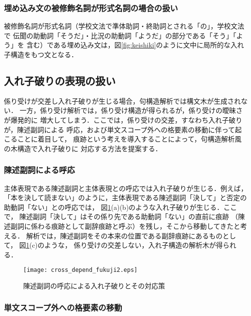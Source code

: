 \documentclass[japanese]{jnlp_1.2}
\begin{document}
    \subsubsection{埋め込み文の被修飾名詞が形式名詞の場合の扱い}

被修飾名詞が形式名詞（学校文法で準体助詞・終助詞とされる「の」，学校文法で
伝聞の助動詞「そうだ」・比況の助動詞「ようだ」の部分である「そう」「よう」を
含む）である埋め込み文は，図\ref{fig:keishiki}のように文中に局所的な入れ子構造をもつ文となる．

\subsection{入れ子破りの表現の扱い}
係り受けが交差し入れ子破りが生じる場合，句構造解析では構文木が生成されない．
一方，係り受け解析では，係り受け構造が得られるが，係り受けの曖昧さが爆発的に
増大してしまう．ここでは，係り受けの交差，すなわち入れ子破りが，陳述副詞による
呼応，および単文スコープ外への格要素の移動に伴って起こることに着目して，
痕跡という考えを導入することによって，句構造解析風の木構造で入れ子破りに
対応する方法を提案する．

    \subsubsection{陳述副詞による呼応}\label{subsub441}

主体表現である陳述副詞と主体表現との呼応では入れ子破りが生じる．例えば，
「本を決して読まない」のように，主体表現である陳述副詞「決して」と否定の
助動詞「ない」との呼応では，
図\ref{fig:cross_depend_fukuji2}(a)(b)のような入れ子破りが生じる．ここで，
陳述副詞「決して」はその係り先である助動詞「ない」の直前に痕跡
（陳述副詞に係わる痕跡として副辞痕跡と呼ぶ）を残し，そこから移動してきたと考える．
解析では，陳述副詞をその本来の位置である副辞痕跡にあるものとして，
図\ref{fig:cross_depend_fukuji2}(c)のような，
係り受けの交差しない，入れ子構造の解析木が得られる．

\begin{figure}[b]
  \centering
      \texttt{[image: cross\_depend\_fukuji2.eps]}
  \caption{陳述副詞の呼応による入れ子破りとその対応策} \label{fig:cross_depend_fukuji2}
\end{figure}

    \subsubsection{単文スコープ外への格要素の移動}
\end{document}
